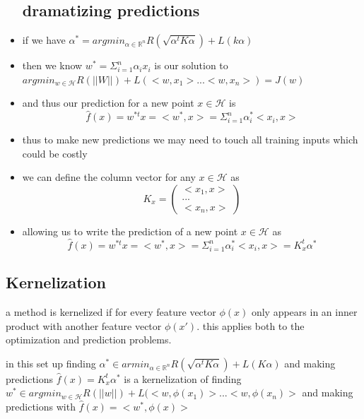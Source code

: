 \documentclass{article}
\begin{document}
\begin{itemize}
\subsection{dramatizing predictions}
\item if we have $\alpha^{*}=argmin_{\alpha \in \mathbb{R}^{n}}R(\sqrt{\alpha^{t}K\alpha})+L(k\alpha)$
\item then we know $w^{*}=\Sigma_{i=1}^{n}\alpha_ix_i$ is our solution to $argmin_{w\in \mathcal{H}}R(||W||)+L(<w,x_1>...<w,x_n>)=J(w)$
\item and thus our prediction for a new point $x\in \mathcal{H}$ is $$\hat{f}(x)=w^{*t}x=<w^{*},x>=\Sigma_{i=1}^n\alpha_{i}^{*}<x_i,x>$$
\item thus to make new predictions we may need to touch all training inputs which could be costly 
\item  we can define the column vector for any $x\in \mathcal{H}$ as $$K_{x}=\begin{pmatrix}
    <x_1,x>\\...\\<x_n,x>
\end{pmatrix}$$
\item  allowing us to write the prediction of a new point $x\in\mathcal{H}$ as $$\hat{f}(x)=w^{*t}x=<w^{*},x>=\Sigma_{i=1}^n\alpha_{i}^{*}<x_i,x>=K_{x}^{t}\alpha^{*}$$
\end{itemize}
\subsection{Kernelization}
\item  a method is kernelized if for every feature vector $\phi(x)$ only appears in an inner product with another feature vector $\phi(x')$. this applies both to the optimization and prediction problems. 
\item in this set up finding  $\alpha^{*}\in armin_{\alpha\in \mathbb{R}^{n}}R(\sqrt{\alpha^{t}K\alpha }) +L(K\alpha)$ and making predictions $\hat{f}(x)=K_{x}^{t}\alpha^{*}$ is a kernelization of finding $w^{*}\in argmin_{w\in\mathcal{H}}R(||w||)+L(<w,\phi(x_1)>...<w,\phi(x_n)>$ and making predictions with $\hat{f}(x)=<w^{*},\phi(x)>$
\end{document}
